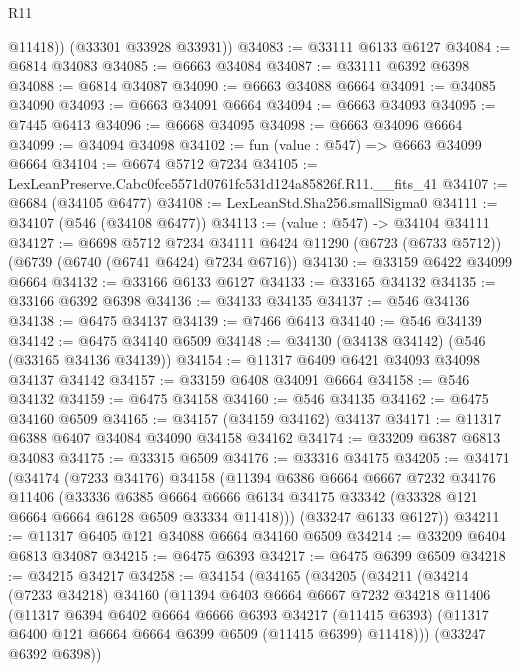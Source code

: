 \begin{lexlean}{R11}
\begin{coremodule}
          @11418))
      (@33301 @33928 @33931))
@34083 := @33111 @6133 @6127
@34084 := @6814 @34083
@34085 := @6663 @34084
@34087 := @33111 @6392 @6398
@34088 := @6814 @34087
@34090 := @6663 @34088 @6664
@34091 := @34085 @34090
@34093 := @6663 @34091 @6664
@34094 := @6663 @34093
@34095 := @7445 @6413
@34096 := @6668 @34095
@34098 := @6663 @34096 @6664
@34099 := @34094 @34098
@34102 := fun (value : @547) => @6663 @34099 @6664
@34104 := @6674 @5712 @7234
@34105 := LexLeanPreserve.Cabc0fce5571d0761fc531d124a85826f.R11.__fits_41
@34107 := @6684 (@34105 @6477)
@34108 := LexLeanStd.Sha256.smallSigma0
@34111 := @34107 (@546 (@34108 @6477))
@34113 := (value : @547) -> @34104 @34111
@34127 := @6698
    @5712
    @7234
    @34111
    @6424
    @11290
    (@6723 (@6733 @5712))
    (@6739 (@6740 (@6741 @6424) @7234 @6716))
@34130 := @33159 @6422 @34099 @6664
@34132 := @33166 @6133 @6127
@34133 := @33165 @34132
@34135 := @33166 @6392 @6398
@34136 := @34133 @34135
@34137 := @546 @34136
@34138 := @6475 @34137
@34139 := @7466 @6413
@34140 := @546 @34139
@34142 := @6475 @34140 @6509
@34148 := @34130 (@34138 @34142) (@546 (@33165 @34136 @34139))
@34154 := @11317 @6409 @6421 @34093 @34098 @34137 @34142
@34157 := @33159 @6408 @34091 @6664
@34158 := @546 @34132
@34159 := @6475 @34158
@34160 := @546 @34135
@34162 := @6475 @34160 @6509
@34165 := @34157 (@34159 @34162) @34137
@34171 := @11317 @6388 @6407 @34084 @34090 @34158 @34162
@34174 := @33209 @6387 @6813 @34083
@34175 := @33315 @6509
@34176 := @33316 @34175
@34205 := @34171
    (@34174
      (@7233 @34176)
      @34158
      (@11394
        @6386
        @6664
        @6667
        @7232
        @34176
        @11406
        (@33336
          @6385
          @6664
          @6666
          @6134
          @34175
          @33342
          (@33328 @121 @6664 @6664 @6128 @6509 @33334 @11418)))
      (@33247 @6133 @6127))
@34211 := @11317 @6405 @121 @34088 @6664 @34160 @6509
@34214 := @33209 @6404 @6813 @34087
@34215 := @6475 @6393
@34217 := @6475 @6399 @6509
@34218 := @34215 @34217
@34258 := @34154
    (@34165
      (@34205
        (@34211
          (@34214
            (@7233 @34218)
            @34160
            (@11394
              @6403
              @6664
              @6667
              @7232
              @34218
              @11406
              (@11317
                @6394
                @6402
                @6664
                @6666
                @6393
                @34217
                (@11415 @6393)
                (@11317 @6400 @121 @6664 @6664 @6399 @6509 (@11415 @6399) @11418)))
            (@33247 @6392 @6398))

\end{coremodule}
\end{lexlean}
